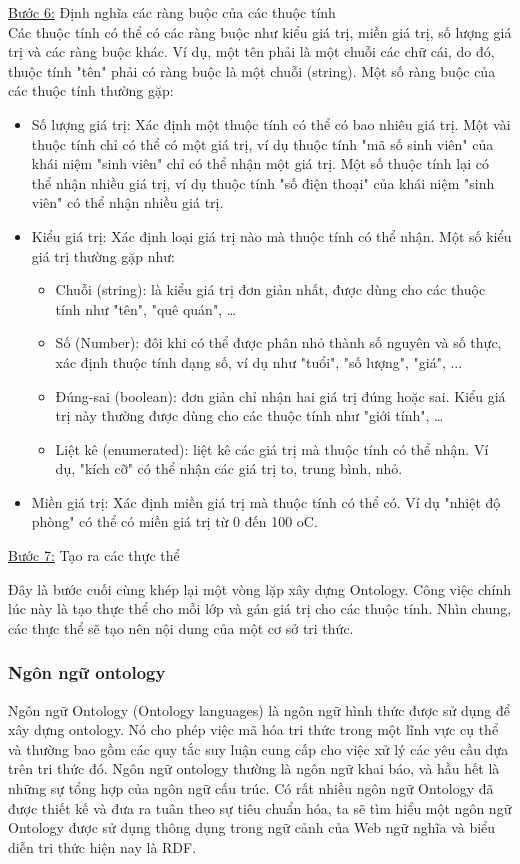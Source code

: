 \underline{Bước 6:} Định nghĩa các ràng buộc của các thuộc tính \\
Các thuộc tính có thể có các ràng buộc như kiểu giá trị, miền giá trị, số lượng giá trị và các ràng buộc khác. Ví dụ, một tên phải là một chuỗi các chữ cái, do đó, thuộc tính "tên" phải có ràng buộc là một chuỗi (string). 
Một số ràng buộc của các thuộc tính thường gặp:
\begin{itemize}
	\item Số lượng giá trị: Xác định một thuộc tính có thể có bao nhiêu giá trị. Một vài thuộc tính chỉ có thể có một giá trị, ví dụ thuộc tính "mã số sinh viên" của khái niệm "sinh viên" chỉ có thể nhận một giá trị. Một số thuộc tính lại có thể nhận nhiều giá trị, ví dụ thuộc tính "số điện thoại" của khái niệm "sinh viên" có thể nhận nhiều giá trị.
	\item Kiểu giá trị: Xác định loại giá trị nào mà thuộc tính có thể nhận. Một số kiểu giá trị thường gặp như:
	\begin{itemize}
		\item Chuỗi (string): là kiểu giá trị đơn giản nhất, được dùng cho các thuộc tính như "tên", "quê quán", …
		\item Số (Number): đôi khi có thể được phân nhỏ thành số nguyên và số thực, xác định thuộc tính dạng số, ví dụ như "tuổi", "số lượng", "giá", ...
		\item Đúng-sai (boolean): đơn giản chỉ nhận hai giá trị đúng hoặc sai. Kiểu giá trị này thường được dùng cho các thuộc tính như "giới tính", …
		\item Liệt kê (enumerated): liệt kê các giá trị mà thuộc tính có thể nhận. Ví dụ, "kích cỡ" có thể nhận các giá trị to, trung bình, nhỏ.
	\end{itemize}
	\item Miền giá trị: Xác định miền giá trị mà thuộc tính có thể có. Ví dụ "nhiệt độ phòng" có thể có miền giá trị từ 0 đến 100 oC.  
\end{itemize}

\underline{Bước 7:} Tạo ra các thực thể
 
Đây là bước cuối cùng khép lại một vòng lặp xây dựng Ontology. Công việc chính lúc này là tạo thực thể cho mỗi lớp và gán giá trị cho các thuộc tính. Nhìn chung, các thực thể sẽ tạo nên nội dung của một cơ sở tri thức. 


\subsubsection{Ngôn ngữ ontology}
Ngôn ngữ Ontology (Ontology languages) là ngôn ngữ hình thức được sử dụng để xây dựng ontology. Nó cho phép việc mã hóa tri thức trong một lĩnh vực cụ thể và thường bao gồm các quy tắc suy luận cung cấp cho việc xử lý các yêu cầu dựa trên tri thức đó. Ngôn ngữ ontology thường là ngôn ngữ khai báo, và hầu hết là những sự tổng hợp của ngôn ngữ cấu trúc. Có rất nhiều ngôn ngữ Ontology đã được thiết kế và đưa ra tuân theo sự tiêu chuẩn hóa, ta sẽ tìm hiểu một ngôn ngữ Ontology được sử dụng thông dụng trong ngữ cảnh của Web ngữ nghĩa và biểu diễn tri thức hiện nay là RDF. 

